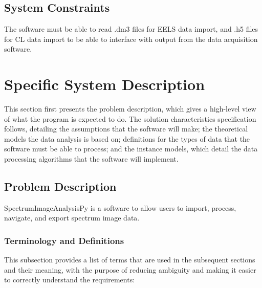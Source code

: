 \documentclass[12pt]{article}
\newcommand{\progname}{SpectrumImageAnalysisPy} %
\begin{document}
\subsection{System Constraints}

The software must be able to read .dm3 files for EELS data import, and .h5 files for CL data import to be able to interface with output from the data acquisition software.

\section{Specific System Description}

This section first presents the problem description, which gives a high-level
view of what the program is expected to do. The solution characteristics specification follows, detailing the assumptions that the software will make; the theoretical models the data analysis is based on; definitions for the types of data that the software must be able to process; and the instance models, which detail the data processing algorithms that the software will implement.

\subsection{Problem Description} \label{Sec_pd}

\progname{} is a software to allow users to import, process, navigate, and export spectrum image data. 

\subsubsection{Terminology and  Definitions}

This subsection provides a list of terms that are used in the subsequent
sections and their meaning, with the purpose of reducing ambiguity and making it
easier to correctly understand the requirements:
\end{document}

